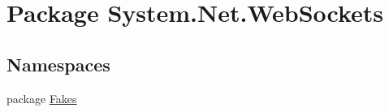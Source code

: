 \hypertarget{namespace_system_1_1_net_1_1_web_sockets}{\section{Package System.\-Net.\-Web\-Sockets}
\label{namespace_system_1_1_net_1_1_web_sockets}
}
\subsection*{Namespaces}
\begin{DoxyCompactItemize}
\item 
package \hyperlink{namespace_system_1_1_net_1_1_web_sockets_1_1_fakes}{Fakes}
\end{DoxyCompactItemize}
